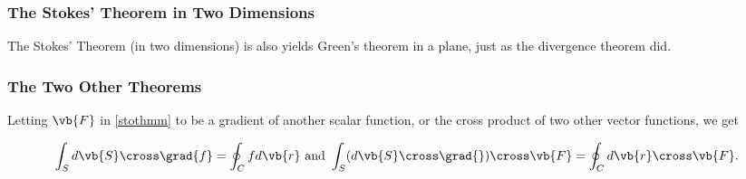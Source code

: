 \documentclass[english,a4paper,12pt]{report}
\begin{document}
\subsubsection{The Stokes' Theorem in Two Dimensions}

The Stokes' Theorem (in two dimensions) is also yields Green's theorem in a plane, just as the divergence theorem did.

\subsubsection{The Two Other Theorems}

Letting \(\vb{F} \) in \cref{stothmm} to be a gradient of another scalar function, or the cross product of two other vector functions, we get 

\begin{equation}
	\int_{S}^{} d\vb{S} \cross \grad{f} = \oint_{C} fd\vb{r} \text { and } \int_{S}^{} (d\vb{S} \cross \grad{} ) \cross \vb{F} = \oint_{C} d\vb{r} \cross \vb{F} .    
\end{equation}
\end{document}
